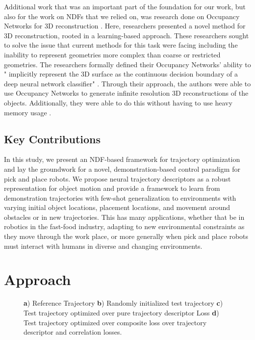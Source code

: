 \documentclass[10pt,twocolumn,letterpaper]{article}
\begin{document}
Additional work that was an important part of the foundation for our work, but also for the work on NDFs that we relied on, was research done on Occupancy Networks for 3D reconstruction \cite{mescheder2019occupancy}. Here, researchers presented a novel method for 3D reconstruction, rooted in a learning-based approach. These researchers sought to solve the issue that current methods for this task were facing including the inability to represent geometries more complex than coarse or restricted geometries. The researchers formally defined their Occupancy Networks' ability to " implicitly represent the 3D surface as the continuous decision boundary of a deep neural network classifier" \cite{mescheder2019occupancy}. Through their approach, the authors were able to use Occupancy Networks to generate infinite resolution 3D reconstructions of the objects. Additionally, they were able to do this without having to use heavy memory usage \cite{mescheder2019occupancy}.

\subsection{Key Contributions}
In this study, we present an NDF-based framework for trajectory optimization and lay the groundwork for a novel, demonstration-based control paradigm for pick and place robots. We propose neural trajectory descriptors as a robust representation for object motion and provide a framework to learn from demonstration trajectories with few-shot generalization to environments with varying initial object locations, placement locations, and movement around obstacles or in new trajectories. This has many applications, whether that be in robotics in the fast-food industry, adapting to new environmental constraints as they move through the work place, or more generally when pick and place robots must interact with humans in diverse and changing environments.

\section{Approach}
\begin{figure}[t]
\centering
\setlength\fboxsep{0pt}
\setlength\fboxrule{0.4pt}
\caption{\textbf{a}) Reference Trajectory  \textbf{b}) Randomly initialized test trajectory  \textbf{c}) Test trajectory optimized over pure trajectory descriptor Loss  \textbf{d}) Test trajectory optimized over composite loss over trajectory descriptor and correlation losses.}
\label{fig:traj_prog}
\end{figure}
\end{document}
